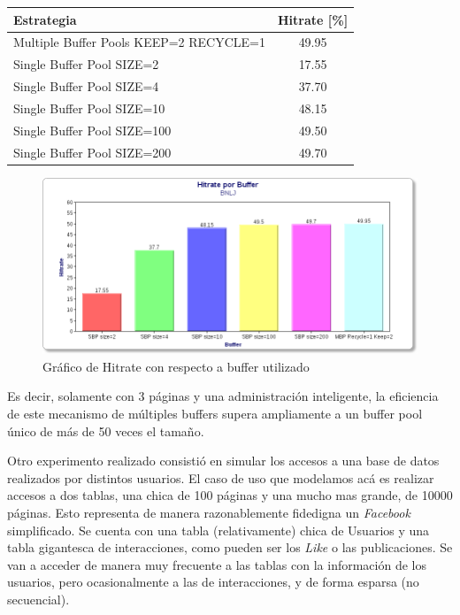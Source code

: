 \begin{table}[H]\centering
    \begin{tabular}{l || c}
    \large{\textbf{Estrategia}}                             & \large{\textbf{Hitrate}} [\%] \\
    \hline
    Multiple Buffer Pools KEEP=2 RECYCLE=1 & 49.95       \\
    Single Buffer Pool SIZE=2              & 17.55       \\
    Single Buffer Pool SIZE=4              & 37.70       \\
    Single Buffer Pool SIZE=10             & 48.15       \\
    Single Buffer Pool SIZE=100            & 49.50       \\
    Single Buffer Pool SIZE=200            & 49.70       \\
    \end{tabular}
\end{table}

\begin{figure}[H]\centering
    \includegraphics[scale=0.4]{BNLJ.png}
    \caption{Gráfico de Hitrate con respecto a buffer utilizado}
    \label{grafiquito}
\end{figure}


Es decir, solamente con 3 p\'aginas y una administraci\'on inteligente, la eficiencia
de este mecanismo de m\'ultiples buffers supera ampliamente a un buffer pool \'unico de
m\'as de 50 veces el tama\~no.

Otro experimento realizado consistió en simular los accesos a una base de datos realizados
por distintos usuarios. El caso de uso que modelamos ac\'a es realizar accesos a dos tablas,
una chica de 100 p\'aginas y una mucho mas grande, de 10000 p\'aginas. Esto representa de manera
razonablemente fidedigna un \textit{Facebook} simplificado. Se cuenta con una tabla (relativamente) chica de Usuarios y 
una tabla gigantesca de interacciones, como pueden ser los \textit{Like} o las publicaciones. 
Se van a acceder de manera muy frecuente a las tablas con la informaci\'on de los usuarios, pero
ocasionalmente a las de interacciones, y de forma esparsa (no secuencial).

